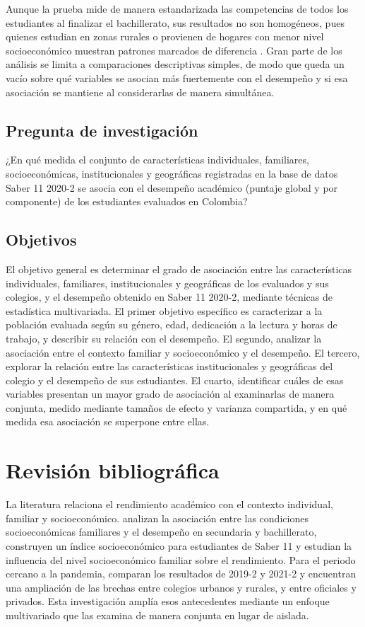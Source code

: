 \documentclass[12pt]{article}
\begin{document}
Aunque la prueba mide de manera estandarizada las competencias de todos los estudiantes al
finalizar el bachillerato, sus resultados no son homogéneos, pues quienes estudian en zonas
rurales o provienen de hogares con menor nivel socioeconómico muestran
patrones marcados de diferencia \parencite{morales2024}. Gran parte de los análisis se limita a
comparaciones descriptivas simples, de modo que queda un vacío sobre qué variables se asocian más
fuertemente con el desempeño y si esa asociación se mantiene al considerarlas de manera
simultánea.

\subsection{Pregunta de investigación}
¿En qué medida el conjunto de características individuales, familiares, socioeconómicas,
institucionales y geográficas registradas en la base de datos Saber 11 2020-2 se asocia con el
desempeño académico (puntaje global y por componente) de los estudiantes evaluados en Colombia?

\subsection{Objetivos}
El objetivo general es determinar el grado de asociación entre las características individuales,
familiares, institucionales y geográficas de los evaluados y sus colegios, y el desempeño obtenido
en Saber 11 2020-2, mediante técnicas de estadística multivariada. El primer objetivo específico
es caracterizar a la población evaluada según su género, edad, dedicación a la lectura y horas de
trabajo, y describir su relación con el desempeño. El segundo, analizar la asociación entre el
contexto familiar y socioeconómico y el desempeño. El tercero, explorar la relación entre las
características institucionales y geográficas del colegio y el desempeño de sus estudiantes. El
cuarto, identificar cuáles de esas variables presentan un mayor grado de asociación al examinarlas
de manera conjunta, medido mediante tamaños de efecto y varianza compartida, y en qué medida esa
asociación se superpone entre ellas.

\vspace{0.1cm}

\section{Revisión bibliográfica}

La literatura relaciona el rendimiento académico con el contexto individual, familiar y
socioeconómico. \textcite{garciagil2021} analizan la asociación entre las condiciones
socioeconómicas familiares y el desempeño en secundaria y bachillerato, \textcite{cruz2016}
construyen un índice socioeconómico para estudiantes de Saber 11 y \textcite{morales2024}
estudian la influencia del nivel socioeconómico familiar sobre el rendimiento. Para el periodo
cercano a la pandemia, \textcite{quintero2025} comparan los resultados de 2019-2 y 2021-2 y
encuentran una ampliación de las brechas entre colegios urbanos y rurales, y entre oficiales y
privados. Esta investigación amplía esos antecedentes mediante un enfoque
multivariado que las examina de manera conjunta en lugar de aislada.
\end{document}
